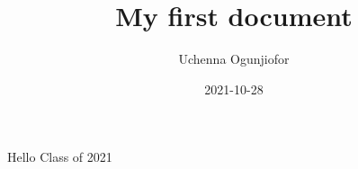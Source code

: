 \documentclass{article}
\title{My first document}
\date{2021-10-28}
\author{Uchenna Ogunjiofor}
\begin{document}
	\maketitle
	\newpage
	Hello Class of 2021
\end{document}
